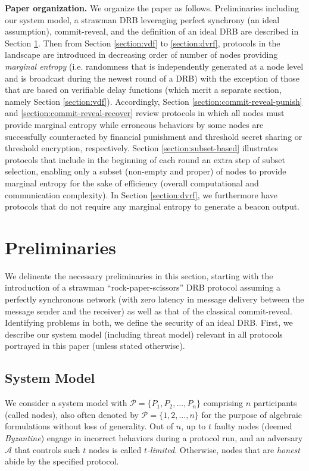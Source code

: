 \documentclass[letterpaper,twocolumn,10pt]{article}
\theoremstyle{definition}
\theoremstyle{remark}
\begin{document}
\textbf{Paper organization.} We organize the paper as follows. Preliminaries including our system model, a strawman DRB leveraging perfect synchrony (an ideal assumption), commit-reveal, and the definition of an ideal DRB are described in Section \ref{section:preliminaries}. Then from Section \ref{section:vdf} to \ref{section:dvrf}, protocols in the landscape are introduced in decreasing order of number of nodes providing \textit{marginal entropy} (i.e. randomness that is independently generated at a node level and is broadcast during the newest round of a DRB) with the exception of those that are based on verifiable delay functions (which merit a separate section, namely Section \ref{section:vdf}). Accordingly, Section \ref{section:commit-reveal-punish} and \ref{section:commit-reveal-recover} review protocols in which all nodes must provide marginal entropy while erroneous behaviors by some nodes are successfully counteracted by financial punishment and threshold secret sharing or threshold encryption, respectively. Section \ref{section:subset-based} illustrates protocols that include in the beginning of each round an extra step of subset selection, enabling only a subset (non-empty and proper) of nodes to provide marginal entropy for the sake of efficiency (overall computational and communication complexity). In Section \ref{section:dvrf}, we furthermore have protocols that do not require any marginal entropy to generate a beacon output.

\section{Preliminaries}
\label{section:preliminaries}
We delineate the necessary preliminaries in this section, starting with the introduction of a strawman ``rock-paper-scissors'' DRB protocol assuming a perfectly synchronous network (with zero latency in message delivery between the message sender and the receiver) as well as that of the classical commit-reveal. Identifying problems in both, we define the security of an ideal DRB. First, we describe our system model (including threat model) relevant in all protocols portrayed in this paper (unless stated otherwise).

\subsection{System Model}
We consider a system model with $\mathcal{P} = \{P_1, P_2, ..., P_n\}$ comprising $n$ participants (called nodes), also often denoted by $\mathcal{P} = \{1, 2, ..., n\}$ for the purpose of algebraic formulations without loss of generality. Out of $n$, up to $t$ faulty nodes (deemed \textit{Byzantine}) engage in incorrect behaviors during a protocol run, and an adversary $\mathcal{A}$ that controls such $t$ nodes is called \textit{$t$-limited}. Otherwise, nodes that are \textit{honest} abide by the specified protocol.
\end{document}
